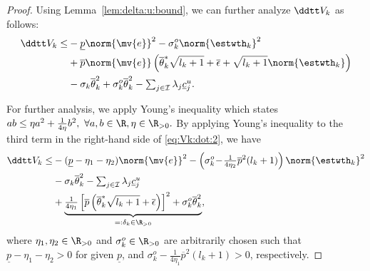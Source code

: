 \documentclass[letterpaper, journal]{IEEEtran}
\begin{document}
\begin{proof}
Using Lemma~\ref{lem:delta:u:bound}, we can further analyze $\ddtt V_{k}$ as follows:
\begin{align} \label{eq:Vk:dot:2} 
  \ddtt V_{k}
  \le&
    -\underline{p}
    \norm{\mv{e}}^2
    -
    \sigma_k^o
    \norm{\estwth_k}^2
  \\ \nonumber
  &
    +
    \overline{p}
    \norm{\mv{e}}
    \left(
      \overline{\theta}^*_k
      \sqrt{l_{k}+1}
      +
      \overline{\epsilon}
      +
      \sqrt{l_k+1}\norm{\estwth_k}
    \right)        
  \\ \nonumber
  &
    -
    \sigma_k 
    \overline{\theta}_k^2
    +
    \sigma_k^o 
    \overline{\theta}_k^2
    -
    \textstyle\sum_{j\in\mathcal{I}}
    \lambda_j
    \underline{c}_j^u
    .
\end{align}

For further analysis, we apply Young's inequality which states 
$
  ab
  \le
  \eta a^2
  +
  \frac{1}{4\eta}b^2,
  \ 
  \forall a,b\in\R, \eta\in\R_{>0}
  .
$
By applying Young's inequality to the third term in the right-hand side of \eqref{eq:Vk:dot:2}, we have
\begin{align} \label{eq:Vk:dot:3} \nonumber
  \ddtt V_{k}
  \le &
    -(\underline{p}-\eta_1-\eta_2)
    \norm{\mv{e}}^2
    -
    \left(
      \sigma_k^o
      \!-\!
      \tfrac{1}{4\eta_2}
      \overline{p}^2
      (l_k+1)
    \right)
    \norm{\estwth_k}^2
  \\ 
  &
    -
    \sigma_k \overline{\theta}_k^2
    -
    \textstyle\sum_{j\in\mathcal{I}}
    \lambda_j
    \underline{c}_j^u
  \\ \nonumber
  &
      +
  \underbrace{
    \tfrac{1}{4\eta_1}
    \left[
    \overline{p}
      \left(
        \overline{\theta}_k^*
        \sqrt{l_{k}+1}
        +
        \overline{\epsilon}
      \right)
    \right]^2
    +
    \sigma_k^o
    \overline{\theta}_k^2
  }_{=: \delta_k \in \R_{>0}}
  ,
\end{align}
where $\eta_1,\eta_2\in\R_{>0}$ and $\sigma_k^o\in\R_{>0}$ are arbitrarily chosen such that $\underline{p}-\eta_1-\eta_2>0$ for given $\underline{p}$, and $\sigma_k^o - \frac{1}{4\eta_1} \overline{p}^2 (l_k+1) > 0$, respectively.


\end{proof}
\end{document}
